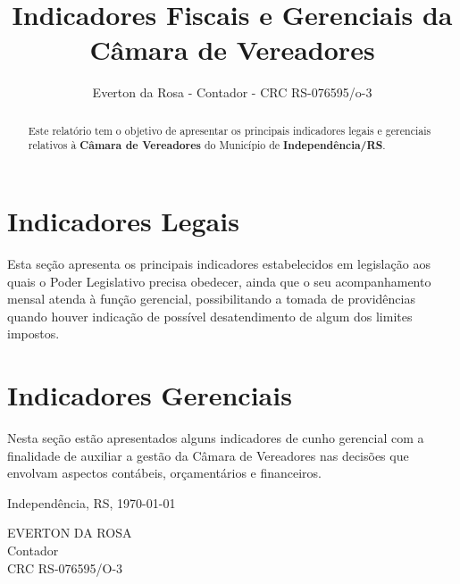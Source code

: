 \documentclass[12pt, a4paper]{article}
\title{Indicadores Fiscais e Gerenciais da Câmara de Vereadores}
\author{Everton da Rosa - Contador - CRC RS-076595/o-3}
\begin{document}
\maketitle

\begin{abstract}
Este relatório tem o objetivo de apresentar os principais indicadores legais e gerenciais relativos à \textbf{Câmara de Vereadores} do Município de \textbf{Independência/RS}.
\end{abstract}

\tableofcontents

\section{Indicadores Legais}

Esta seção apresenta os principais indicadores estabelecidos em legislação aos quais o Poder Legislativo precisa obedecer, ainda que o seu acompanhamento mensal atenda à função gerencial, possibilitando a tomada de providências quando houver indicação de possível desatendimento de algum dos limites impostos.







\section{Indicadores Gerenciais}

Nesta seção estão apresentados alguns indicadores de cunho gerencial com a finalidade de auxiliar a gestão da Câmara de Vereadores nas decisões que envolvam aspectos contábeis, orçamentários e financeiros.




\vspace{16pt}

\begin{center}
	Independência, RS, \today
\end{center}

\vspace{36pt}

\begin{center}
	EVERTON DA ROSA\\
	Contador\\
	CRC RS-076595/O-3
\end{center}
\end{document}
